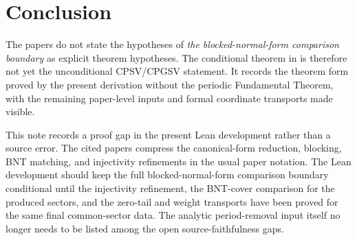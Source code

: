 \documentclass{article}
\begin{document}
\section{Conclusion}

The papers do not state the hypotheses of
\emph{the blocked-normal-form comparison boundary} as explicit theorem
hypotheses. The conditional theorem in  is therefore not yet the
unconditional CPSV/CPGSV statement. It records the theorem form proved by the
present derivation without the periodic Fundamental Theorem, with the remaining
paper-level inputs and formal coordinate transports made visible.

This note records a proof gap in the present Lean development rather than a
source error. The cited papers compress the canonical-form reduction, blocking,
BNT matching, and injectivity refinements in the usual paper notation. The Lean
development should keep the full blocked-normal-form comparison boundary
conditional until the injectivity refinement, the BNT-cover comparison for the
produced sectors, and the zero-tail and weight transports have been proved for
the same final common-sector data. The analytic period-removal input itself no
longer needs to be listed among the open source-faithfulness gaps.



\end{document}
